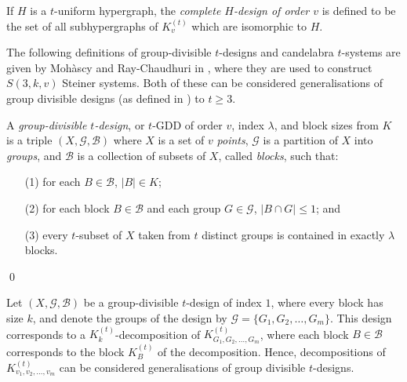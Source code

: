 If $H$ is a $t$-uniform hypergraph, the {\em complete $H$-design of order $v$} is defined to be the set of all subhypergraphs of $K_{v}^{(t)}$ which are isomorphic to $H$.



The following definitions of group-divisible $t$-designs and candelabra $t$-systems are given by Moh\`{a}scy and Ray-Chaudhuri in \cite{mohascy}, where they are used to construct $S(3, k, v)$ Steiner systems.
Both of these can be considered generalisations of group divisible designs (as defined in \cite{mull-gron}) to $t \geq 3$.

\begin{definition}
A {\em group-divisible $t$-design}, or $t$-GDD of order $v$, index $\lambda$, and block sizes from $K$ is a triple $(X, \mathcal{G}, \mathcal{B})$ where $X$ is a set of $v$ {\em points}, $\mathcal{G}$ is a partition of $X$ into {\em groups}, and $\mathcal{B}$ is a collection of subsets of $X$, called {\em blocks}, such that:
\begin{enumerate}
    \item[(1)] for each $B \in \mathcal{B}$, $|B| \in K$;
    \item[(2)] for each block $B \in \mathcal{B}$ and each group $G \in \mathcal{G}$, $|B \cap G| \leq 1$; and
    \item[(3)] every $t$-subset of $X$ taken from $t$ distinct groups is contained in exactly $\lambda$ blocks.
\end{enumerate}
\qed
\end{definition}

Let $(X, \mathcal{G}, \mathcal{B})$ be a group-divisible $t$-design of index $1$, where every block has size $k$, and denote the groups of the design by $\mathcal{G} = \{G_1, G_2, \ldots, G_m\}$.
This design corresponds to a $K_{k}^{(t)}$-decomposition of $K_{G_1, G_2, \ldots, G_m}^{(t)}$, where each block $B \in \mathcal{B}$ corresponds to the block $K_{B}^{(t)}$ of the decomposition.
Hence, decompositions of $K_{v_1, v_2, \ldots, v_m}^{(t)}$ can be considered generalisations of group divisible $t$-designs.

